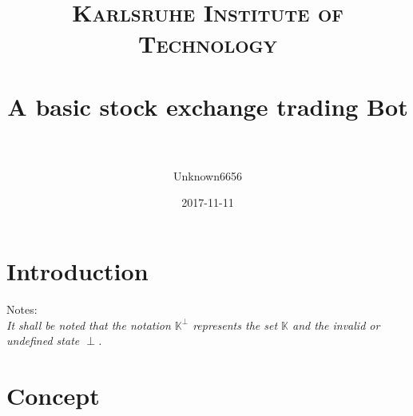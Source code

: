 \documentclass[paper=a4, fontsize=11pt]{scrartcl}
\title{
    \normalfont \normalsize
    \textsc{Karlsruhe Institute of Technology} \\[25pt]
    \horrule{0.5pt} \\[0.4cm]
    \huge A basic stock exchange trading Bot \\
    \horrule{2pt} \\[0.5cm]
}
\author{Unknown6656}
\date{2017-11-11}
\numberwithin{equation}{section}
\numberwithin{figure}{section}
\numberwithin{table}{section}
\begin{document}
    \maketitle
    \section{Introduction}

	Notes:\\
	\textit{It shall be noted that the notation $ \mathbb{K}^\perp $ represents the set $ \mathbb{K} $ and the invalid or undefined state $ \perp $.}
    \section{Concept}
    
\end{document}
